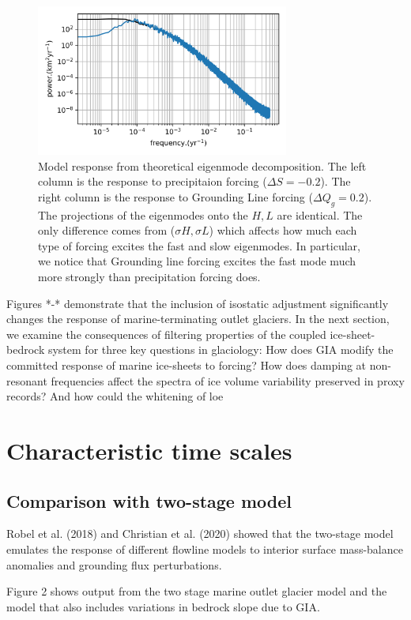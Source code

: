 \documentclass[tc, manuscript]{copernicus}
\begin{document}
\begin{figure}[t]
\includegraphics[width=8.3cm]{../figures/simulationSMB03.png}
\caption{Model response from theoretical eigenmode decomposition.
The left column is the response to precipitaion forcing ($\Delta S = −0.2$). 
The right column is the response to Grounding Line forcing ($\Delta Q_g = 0.2$).
The projections of the eigenmodes onto the $H, L$ are identical. The only difference comes from ($\sigma H, \sigma L$) which affects how much each type of forcing excites the fast and slow eigenmodes.
In particular, we notice that Grounding line forcing excites the fast mode much more strongly than precipitation forcing does.}
\end{figure}


Figures *-* demonstrate that the inclusion of isostatic adjustment significantly changes the response of marine-terminating outlet glaciers. 
In the next section, we examine the consequences of filtering properties of the coupled ice-sheet-bedrock system for three key questions in glaciology: 
How does GIA modify the committed response of marine ice-sheets to forcing?
How does damping at non-resonant frequencies affect the spectra of ice volume variability preserved in proxy records?
And how could the whitening of loe 


\section{Characteristic time scales}
\subsection{Comparison with two-stage model}
Robel et al. (2018) and Christian et al. (2020) showed that the two-stage model emulates the response of different flowline models to interior surface mass-balance anomalies and grounding flux perturbations. 

Figure 2 shows output from the two stage marine outlet glacier model and the model that also includes variations in bedrock slope due to GIA.
\end{document}
